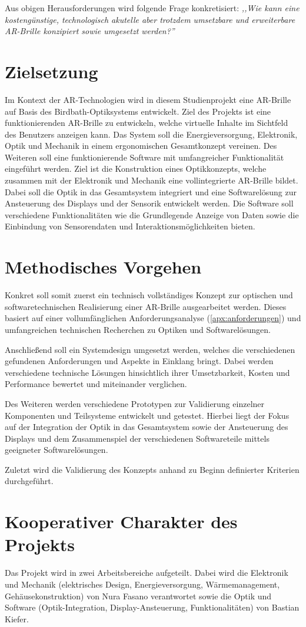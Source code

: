 Aus obigen Herausforderungen wird folgende Frage konkretisiert: \textit{,,Wie kann eine kostengünstige, technologisch akutelle aber trotzdem umsetzbare und erweiterbare AR-Brille konzipiert sowie umgesetzt werden?''}

\section{Zielsetzung}
\label{sec:zielsetzung}
Im Kontext der \ac{AR}-Technologien wird in diesem Studienprojekt eine \ac{AR}-Brille auf Basis des Birdbath-Optiksystems entwickelt. Ziel des Projekts ist eine funktionierenden \ac{AR}-Brille zu entwickeln, welche virtuelle Inhalte im Sichtfeld des Benutzers anzeigen kann. Das System soll die Energieversorgung, Elektronik, Optik und Mechanik in einem ergonomischen Gesamtkonzept vereinen.\newline
Des Weiteren soll eine funktionierende Software mit umfangreicher Funktionalität eingeführt werden.
Ziel ist die Konstruktion eines Optikkonzepts, welche zusammen mit der Elektronik und Mechanik eine vollintegrierte \ac{AR}-Brille bildet. Dabei soll die Optik in das Gesamtsystem integriert und eine Softwarelösung zur Ansteuerung des Displays und der Sensorik entwickelt werden. Die Software soll verschiedene Funktionalitäten wie die Grundlegende Anzeige von Daten sowie die Einbindung von Sensorendaten und Interaktionsmöglichkeiten bieten.

\section{Methodisches Vorgehen}
Konkret soll somit zuerst ein technisch vollständiges Konzept zur optischen und softwaretechnischen Realisierung einer \ac{AR}-Brille ausgearbeitet werden. Dieses basiert auf einer vollumfänglichen Anforderungsanalyse (\ref{apx:anforderungen}) und umfangreichen technischen Recherchen zu Optiken und Softwarelösungen.

Anschließend soll ein Systemdesign umgesetzt werden, welches die verschiedenen gefundenen Anforderungen und Aspekte in Einklang bringt. Dabei werden verschiedene technische Lösungen hinsichtlich ihrer Umsetzbarkeit, Kosten und Performance bewertet und miteinander verglichen.

Des Weiteren werden verschiedene Prototypen zur Validierung einzelner Komponenten und Teilsysteme entwickelt und getestet. Hierbei liegt der Fokus auf der Integration der Optik in das Gesamtsystem sowie der Ansteuerung des Displays und dem Zusammenspiel der verschiedenen Softwareteile mittels geeigneter Softwarelösungen.

Zuletzt wird die Validierung des Konzepts anhand zu  Beginn definierter Kriterien durchgeführt.

\section{Kooperativer Charakter des Projekts}
Das Projekt wird in zwei Arbeitsbereiche aufgeteilt. Dabei wird die Elektronik und Mechanik (elektrisches Design, Energieversorgung, Wärmemanagement, Gehäusekonstruktion) von Nura Fasano verantwortet sowie die Optik und Software (Optik-Integration, Display-Ansteuerung, Funktionalitäten) von Bastian Kiefer.
